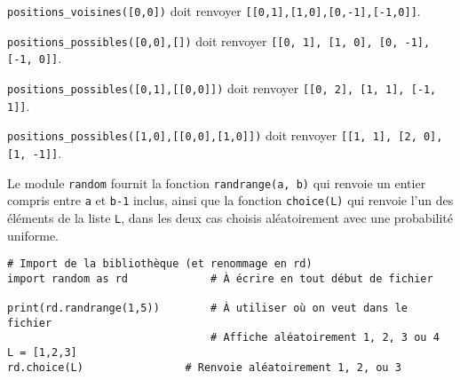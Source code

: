 
\begin{test}
\lstinline{positions_voisines([0,0])} doit renvoyer \lstinline{[[0,1],[1,0],[0,-1],[-1,0]]}.
\end{test}






\begin{test}
\lstinline{positions_possibles([0,0],[])} doit renvoyer \lstinline{[[0, 1], [1, 0], [0, -1], [-1, 0]]}.

\lstinline{positions_possibles([0,1],[[0,0]])} doit renvoyer \lstinline{[[0, 2], [1, 1], [-1, 1]]}.

\lstinline{positions_possibles([1,0],[[0,0],[1,0]])} doit renvoyer \lstinline{[[1, 1], [2, 0], [1, -1]]}.
\end{test}






Le module \lstinline{random} fournit la fonction \lstinline{randrange(a, b)} qui renvoie un entier compris entre \lstinline{a} et \lstinline{b-1} inclus, ainsi que la fonction \lstinline{choice(L)} qui renvoie l’un des éléments de la liste \lstinline{L}, dans les deux cas choisis aléatoirement avec une probabilité uniforme.

\begin{lstlisting}
# Import de la bibliothèque (et renommage en rd)
import random as rd 			# À écrire en tout début de fichier

print(rd.randrange(1,5))		# À utiliser où on veut dans le fichier
        						# Affiche aléatoirement 1, 2, 3 ou 4
L = [1,2,3]
rd.choice(L)				# Renvoie aléatoirement 1, 2, ou 3

\end{lstlisting}

